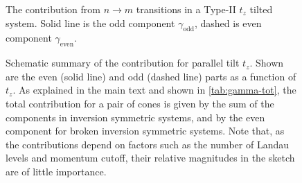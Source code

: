 \begin{figure}[htbp]
{
  } %
  \caption{The contribution from \( n\to m \) transitions in a Type-II \(t_z\) tilted system.
    Solid line is the odd component \( \gamma_{\text{odd}} \), dashed is even component \( \gamma_{\text{even}} \).
  }
  \label{fig:contribtzII}
\end{figure}

\begin{figure}[htbp]
  \centering
  \caption{
    Schematic summary of the contribution for parallel tilt \( t_z \).
    Shown are the even (solid line) and odd (dashed line) parts as a function of \( t_z \).
    As explained in the main text and shown in \cref{tab:gamma-tot}, the total contribution for a pair of cones is given by the sum of the components in inversion symmetric systems, and by the even component for broken inversion symmetric systems.
    Note that, as the contributions depend on factors such as the number of Landau levels and momentum cutoff, their relative magnitudes in the sketch are of little importance.%
    \label{fig:scetch}}
\end{figure}

